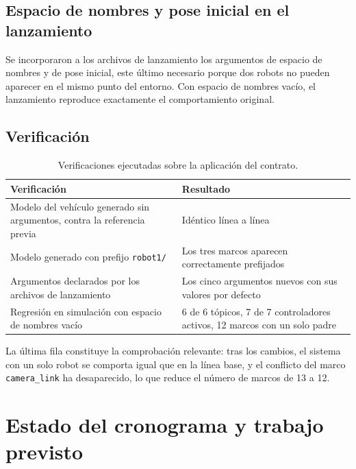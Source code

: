\documentclass[12pt,letterpaper]{article}
\begin{document}
\subsection{Espacio de nombres y pose inicial en el lanzamiento}

Se incorporaron a los archivos de lanzamiento los argumentos de espacio de nombres y de pose inicial, este último necesario porque dos robots no pueden aparecer en el mismo punto del entorno. Con espacio de nombres vacío, el lanzamiento reproduce exactamente el comportamiento original.

\subsection{Verificación}

\begin{table}[H]
    \centering
    \small
    \caption{Verificaciones ejecutadas sobre la aplicación del contrato.}
    \label{tab:verificacion}
    \begin{tabular}{@{}p{6.0cm}p{7.5cm}@{}}
        \toprule
        \textbf{Verificación} & \textbf{Resultado} \\ \midrule
        Modelo del vehículo generado sin argumentos, contra la referencia previa & Idéntico línea a línea \\ \addlinespace
        Modelo generado con prefijo \texttt{robot1/} & Los tres marcos aparecen correctamente prefijados \\ \addlinespace
        Argumentos declarados por los archivos de lanzamiento & Los cinco argumentos nuevos con sus valores por defecto \\ \addlinespace
        Regresión en simulación con espacio de nombres vacío & 6 de 6 tópicos, 7 de 7 controladores activos, 12 marcos con un solo padre \\ \bottomrule
    \end{tabular}
\end{table}

La última fila constituye la comprobación relevante: tras los cambios, el sistema con un solo robot se comporta igual que en la línea base, y el conflicto del marco \texttt{camera\_link} ha desaparecido, lo que reduce el número de marcos de 13 a 12.

\section{Estado del cronograma y trabajo previsto}
\label{sec:previsto}
\end{document}
